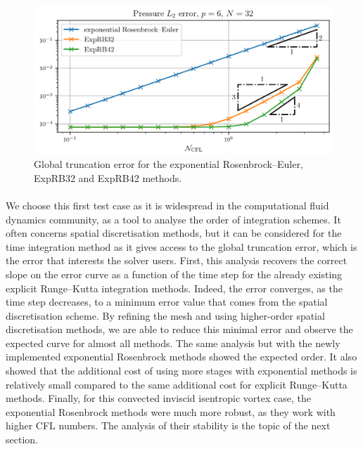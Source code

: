       \begin{figure}
        \centering
        \includegraphics{figures/covo_exp.png}
        \caption{Global truncation error for the exponential Rosenbrock--Euler, ExpRB32 and ExpRB42 methods.}
        \label{fig:covo_exp}
      \end{figure}

      \paragraph{}
      We choose this first test case as it is widespread in the computational fluid dynamics community, as a tool to analyse the order of integration schemes.
      It often concerns spatial discretisation methods, but it can be considered for the time integration method as it gives access to the global truncation error, which is the error that interests the solver users.
      First, this analysis recovers the correct slope on the error curve as a function of the time step for the already existing explicit Runge--Kutta integration methods.
      Indeed, the error converges, as the time step decreases, to a minimum error value that comes from the spatial discretisation scheme.
      By refining the mesh and using higher-order spatial discretisation methods, we are able to reduce this minimal error and observe the expected curve for almost all methods.
      The same analysis but with the newly implemented exponential Rosenbrock methods showed the expected order.
      It also showed that the additional cost of using more stages with exponential methods is relatively small compared to the same additional cost for explicit Runge--Kutta methods.
      Finally, for this convected inviscid isentropic vortex case, the exponential Rosenbrock methods were much more robust, as they work with higher CFL numbers.
      The analysis of their stability is the topic of the next section.


